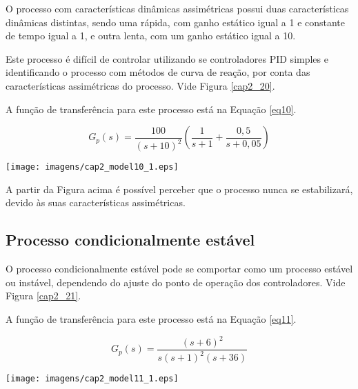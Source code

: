     O processo com características dinâmicas assimétricas possui duas características
    dinâmicas distintas, sendo uma rápida, com ganho estático igual a 1 e constante
    de tempo igual a 1, e outra lenta, com um ganho estático igual a 10.
    
    Este processo é difícil de controlar utilizando se controladores \acs{PID}
    simples e identificando o processo com métodos de curva de reação, por conta das
    características assimétricas do processo. Vide Figura \ref{cap2_20}.
    
    A função de transferência para este processo está na Equação \ref{eq10}.

    \begin{equation}
        \label{eq10}
        G_p(s) = \frac{100}{(s+10)^2}\left ( \frac{1}{s+1} + \frac{0,5}{s+0,05} \right )
    \end{equation}
    
    \begin{center}
        \texttt{[image: imagens/cap2\_model10\_1.eps]}
        \label{cap2_20}
    \end{center}

    A partir da Figura acima é possível perceber que o processo nunca se estabilizará,
    devido às suas características assimétricas.

\subsection{Processo condicionalmente estável}
    
    O processo condicionalmente estável pode se comportar como um processo estável
    ou instável, dependendo do ajuste do ponto de operação dos controladores.
    Vide Figura \ref{cap2_21}.

    A função de transferência para este processo está na Equação \ref{eq11}.
    
    \begin{equation}
        \label{eq11}
        G_p(s) = \frac{(s+6)^2}{s(s+1)^2 (s+36)}
    \end{equation}
    
    \begin{center}
        \texttt{[image: imagens/cap2\_model11\_1.eps]}
        \label{cap2_21}
    \end{center}

